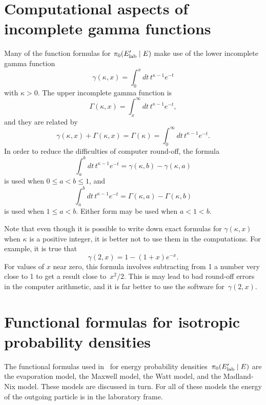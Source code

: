\section{Computational aspects of incomplete gamma functions}
Many
of the function formulas for $\pi_0(E_{\text{lab}}' \mid E)$ make use of the 
lower incomplete gamma function
\begin{equation}
  \gamma(\kappa, x) =
   \int_0^x dt\, t^{\kappa - 1} e^{-t}
  \label{def-gamma}
\end{equation}
with $\kappa > 0$.  The upper incomplete gamma
function is
\begin{equation}
  \Gamma(\kappa, x) =
   \int_x^\infty dt\, t^{\kappa - 1} e^{-t},
  \label{def-Gamma}
\end{equation}
and they are related by
$$
  \gamma(\kappa, x) + \Gamma(\kappa, x) = \Gamma(\kappa) =
  \int_0^\infty dt\, t^{\kappa - 1} e^{-t}.
$$
In order to reduce the difficulties of computer round-off,
the formula
$$
  \int_a^b dt\, t^{\kappa - 1} e^{-t} =
  \gamma( \kappa, b ) - \gamma( \kappa, a )
$$
is used when $0 \le a < b \le 1$, and
$$
  \int_a^b dt\, t^{\kappa - 1} e^{-t} =
  \Gamma( \kappa, a ) - \Gamma( \kappa, b )
$$
is used when $1 \le a < b$.  Either form may be used when
$a < 1 < b$.

Note that even though it is possible to write down
exact formulas for $\gamma(\kappa, x)$ when $\kappa$ is a
positive integer, it is better not to use them in the computations.
For example, it is true that
$$
  \gamma(2, x) = 1 - (1 + x)e^{-x}.
$$
For values of $x$ near zero, this formula involves subtracting
from 1 a number very close to 1 to get a result close to~$x^2/2$.
This is may lead to bad round-off errors in the computer arithmetic, 
and it is far better to
use the software for~$\gamma(2, x)$.

\section{Functional formulas for isotropic probability densities}
The functional formulas used in  \xendl\ for energy 
probability densities~$\pi_0(E_{\text{lab}}' \mid E)$ are the evaporation model,
the Maxwell model, the Watt model, and the Madland-Nix model.
These models are discussed in turn.  For all of these models the
energy of the outgoing particle is in the laboratory frame.

